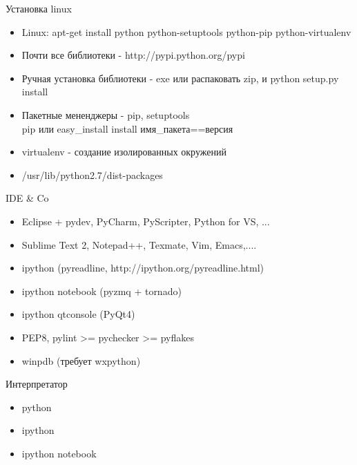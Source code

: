 \documentclass{article}
\begin{document}
\begin{center} Установка linux \end{center}
\begin{itemize}
    \item Linux: apt-get install python python-setuptools python-pip python-virtualenv
    \item Почти все библиотеки - http://pypi.python.org/pypi
    \item Ручная установка библиотеки - exe или распаковать zip, и python setup.py install
    \item Пакетные мененджеры - pip, setuptools \\
        pip или easy\_install install имя\_пакета==версия
    \item virtualenv - создание изолированных окружений
    \item /usr/lib/python2.7/dist-packages
\end{itemize}
\newpage

\begin{center} IDE \& Co \end{center}
\begin{itemize}
    \item Eclipse + pydev, PyCharm, PyScripter, Python for VS, ...
    \item Sublime Text 2, Notepad++, Texmate, Vim, Emacs,....
    \item ipython (pyreadline, http://ipython.org/pyreadline.html)
    \item ipython notebook (pyzmq + tornado)
    \item ipython qtconsole (PyQt4)
    \item PEP8, pylint >= pychecker >= pyflakes
    \item winpdb (требует wxpython)
\end{itemize}
\newpage

\begin{center} Интерпретатор \end{center}
\begin{itemize}
    \item python
    \item ipython
    \item ipython notebook
\end{itemize}
\newpage
\end{document}
